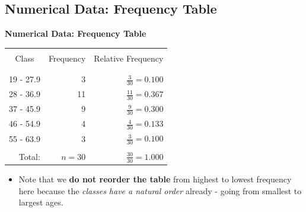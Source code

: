 \documentclass[compress]{beamer}        %
\makeatletter
\newcommand{\tcb}{\textcolor{beamer@blendedblue}}
\makeatother
\begin{document}
\subsection{Numerical Data: Frequency Table}
\begin{frame}{\bf \tcb{Numerical Data: Frequency Table}}

\begin{center}
\begin{tabular}{|c|r|r|}
\hline
&&\\[-0.4cm]
Class      & Frequency & Relative Frequency \\
&&\\[-0.5cm]
\hline
&&\\[-0.4cm]
19 - 27.9  &    3     & $\tfrac{3}{30} = 0.100$ \\[0.2cm]
28 - 36.9  &   11     & $\tfrac{11}{30} = 0.367$ \\[0.2cm]
37 - 45.9  &    9     & $\tfrac{9}{30} = 0.300$ \\[0.2cm]
46 - 54.9  &    4     & $\tfrac{4}{30} = 0.133$ \\[0.2cm]
55 - 63.9  &    3     & $\tfrac{3}{30} = 0.100$ \\[0.2cm]
\hline
&&\\[-0.4cm]
\multicolumn{1}{|r|}{Total:} & $n = 30$ & $\tfrac{30}{30} = 1.000$ \\[0.1cm]
\hline
\end{tabular}
\end{center}
\begin{itemize}\itemsep0.2cm
\item Note that we {\bf do not reorder the table} from highest to lowest frequency here because the \emph{classes have a natural order} already - going from smallest to largest ages.
\end{itemize}

\end{frame}
\end{document}
